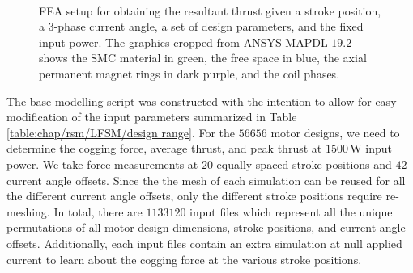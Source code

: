             
            \begin{figure}[!ht]
                \centering
                \\
                \caption{ 
                    \label{fig:chapter/rsm/LFSM/FEA} FEA setup for obtaining the resultant thrust given a stroke position, a 3-phase current angle, a set of design parameters, and the fixed input power. The graphics cropped from ANSYS MAPDL $19.2$ shows the \acs{SMC} material in green, the free space in blue, the axial permanent magnet rings in dark purple, and the coil phases.
                }
            \end{figure}
            
            
            The base modelling script was constructed with the intention to allow for easy modification of the input parameters summarized in Table\,\ref{table:chap/rsm/LFSM/design range}. For the $56656$ motor designs, we need to determine the cogging force, average thrust, and peak thrust at $1500\,\mathrm{W}$ input power. We take force measurements at $20$ equally spaced stroke positions and $42$ current angle offsets. Since the the mesh of each simulation can be reused for all the different current angle offsets, only the different stroke positions require re-meshing. In total, there are $1133120$ input files which represent all the unique permutations of all motor design dimensions, stroke positions, and current angle offsets. Additionally, each input files contain an extra simulation at null applied current to learn about the cogging force at the various stroke positions. 
            
